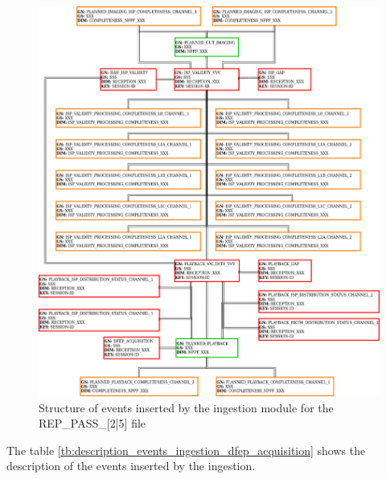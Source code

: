 \begin{figure}[H]
  \begin{center}
	\centering\includegraphics[width=150mm]{../fig/structure_ingestion_dfep_acquisition.png}
	\caption{Structure of events inserted by the ingestion module for the REP\_PASS\_[2|5] file}
	\label{fg:structure_ingestion_dfep_acquisition}
  \end{center}
\end{figure}

The table \ref{tb:description_events_ingestion_dfep_acquisition} shows the description of the events inserted by the ingestion.

